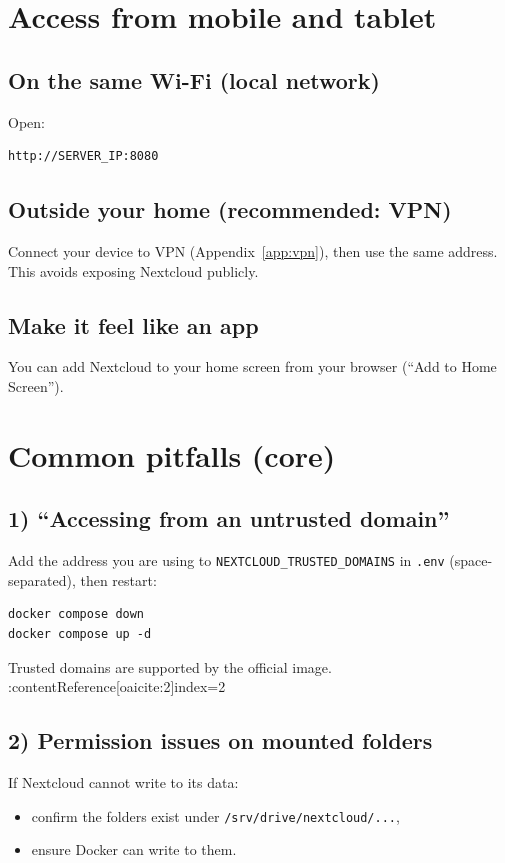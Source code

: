 \section{Access from mobile and tablet}
\subsection*{On the same Wi-Fi (local network)}
Open:

\begin{lstlisting}
http://SERVER_IP:8080
\end{lstlisting}

\subsection*{Outside your home (recommended: VPN)}
Connect your device to VPN (Appendix~\ref{app:vpn}), then use the same address.
This avoids exposing Nextcloud publicly.

\subsection*{Make it feel like an app}
You can add Nextcloud to your home screen from your browser (``Add to Home Screen'').

\section{Common pitfalls (core)}
\subsection{1) ``Accessing from an untrusted domain''}
Add the address you are using to \texttt{NEXTCLOUD\_TRUSTED\_DOMAINS} in \texttt{.env} (space-separated),
then restart:

\begin{lstlisting}
docker compose down
docker compose up -d
\end{lstlisting}

Trusted domains are supported by the official image. :contentReference[oaicite:2]{index=2}

\subsection{2) Permission issues on mounted folders}
If Nextcloud cannot write to its data:
\begin{itemize}[leftmargin=*]
  \item confirm the folders exist under \texttt{/srv/drive/nextcloud/...},
  \item ensure Docker can write to them.
\end{itemize}


